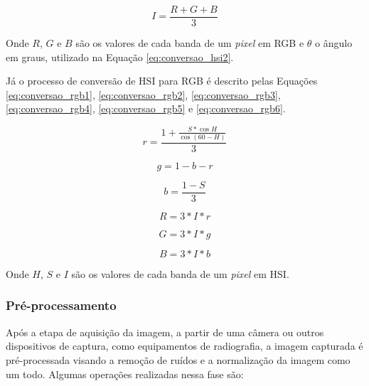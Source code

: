 \documentclass[12pt,oneside,a4paper,chapter=TITLE,section=TITLE,sumario
		=tradicional]{abntex2}
\begin{document}
			\begin{equation}
			\label{eq:conversao_hsi4}
			I = \frac{R+G+B}{3}
			\end{equation}
					
			\hspace{-1.3cm}Onde $R$, $G$ e $B$ são os valores de cada banda de um \textit{pixel} em RGB e $\theta$ o ângulo em graus, utilizado na Equação \ref{eq:conversao_hsi2}.
				
			Já o processo de conversão de HSI para RGB é descrito pelas Equações \ref{eq:conversao_rgb1}, \ref{eq:conversao_rgb2}, \ref{eq:conversao_rgb3},  \ref{eq:conversao_rgb4}, \ref{eq:conversao_rgb5} e \ref{eq:conversao_rgb6}.
			
			\begin{equation}
			\label{eq:conversao_rgb1}
			r = \frac{1 + \frac{S * \cos H}{\cos(60 - H)}}{3}
			\end{equation}
			
			\begin{equation}
			\label{eq:conversao_rgb2}
			g = 1 - b - r
			\end{equation}
			
			\begin{equation}
			\label{eq:conversao_rgb3}
			b = \frac{1 - S}{3}
			\end{equation}
			
			\begin{equation}
			\label{eq:conversao_rgb4}
			R = 3*I*r
			\end{equation}
			
			\begin{equation}
			\label{eq:conversao_rgb5}
			G = 3*I*g
			\end{equation}
			
			\begin{equation}
			\label{eq:conversao_rgb6}
			B = 3*I*b
			\end{equation}
								
		\hspace{-1.3cm}Onde $H$, $S$ e $I$ são os valores de cada banda de um \textit{pixel} em HSI.
			
		\subsubsection{Pré-processamento}
		\label{sec:preprocessamento}
		
		Após a etapa de aquisição da imagem, a partir de uma câmera ou outros dispositivos de captura, como equipamentos de radiografia, a imagem capturada é pré-processada visando a remoção de ruídos e a normalização da imagem como um todo. Algumas operações realizadas nessa fase são:
		
\end{document}
